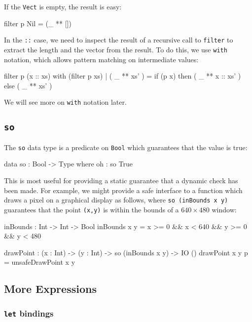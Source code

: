 \noindent
If the \texttt{Vect} is empty, the result is easy:

\begin{code}
filter p Nil = (_ ** [])
\end{code}


\noindent
In the \texttt{::} case, we need to inspect the result of a recursive call to \texttt{filter} to extract the length and the vector from the result.
To do this, we use \texttt{with} notation, which allows pattern matching on intermediate values:

\begin{code}
filter p (x :: xs) with (filter p xs)
  | ( _ ** xs' ) = if (p x) then ( _ ** x :: xs' ) else ( _ ** xs' )
\end{code}

\noindent
We will see more on \texttt{with} notation later.

\subsection{\texttt{so}}

The \texttt{so} data type is a predicate on \texttt{Bool} which guarantees that the value is true:

\begin{code}
data so : Bool -> Type where
    oh : so True
\end{code}
 
\noindent
This is most useful for providing a static guarantee that a dynamic check has been made.
For example, we might provide a safe interface to a function which draws a pixel on a graphical display as follows, where \texttt{so (inBounds x y)} guarantees that  the point \texttt{(x,y)} is within the bounds of a $640\times480$ window:

\begin{code}
inBounds : Int -> Int -> Bool
inBounds x y = x >= 0 && x < 640 && y >= 0 && y < 480

drawPoint : (x : Int) -> (y : Int) -> so (inBounds x y) -> IO ()
drawPoint x y p = unsafeDrawPoint x y
\end{code}
 

\subsection{More Expressions}

\subsubsection*{\texttt{let} bindings}

